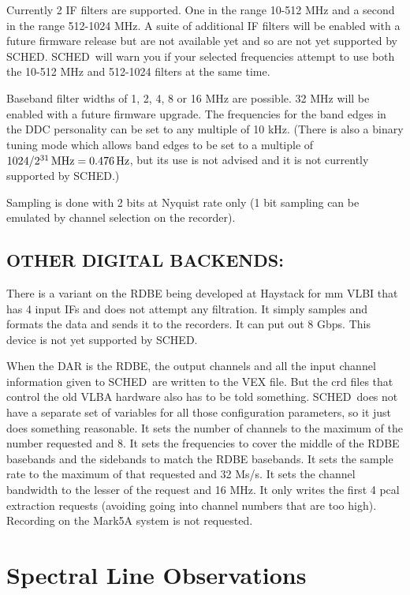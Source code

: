 \documentclass{report}
\newcommand{\sched}{{\sc SCHED}}
\newcommand{\schedb}{{\sc SCHED~}}
\begin{document}
Currently 2 IF filters are supported. One in the range 10-512 MHz and a
second in the range 512-1024 MHz. A suite of additional IF filters will
be enabled with a future firmware release but are not available yet and
so are not yet supported by \sched. \schedb will warn you if your
selected frequencies attempt to use both the 10-512 MHz and 512-1024
filters at the same time.

Baseband filter widths of 1, 2, 4, 8 or 16 MHz are possible. 32 MHz will
be enabled with a future firmware upgrade. The frequencies for the band
edges in the DDC personality can be set to any multiple of 10 kHz.
(There is also a binary tuning mode which allows band edges to be set to
a multiple of $1024/2^{31} \,{\rm MHz} = 0.476 \,{\rm Hz}$, but its use
is not advised and it is not currently supported by \sched.)

Sampling is done with 2 bits at Nyquist rate only (1 bit sampling can be
emulated by channel selection on the recorder).



\subsection{\label{SSEC:OTHERREC}OTHER DIGITAL BACKENDS:}

There is a variant on the RDBE being developed at Haystack for mm VLBI
that has 4 input IFs and does not attempt any filtration.  It simply
samples and formats the data and sends it to the recorders.  It can
put out 8 Gbps.  This device is not yet supported by SCHED.

When the DAR is the RDBE, the output channels and all the input
channel information given to \schedb are written to the VEX file.  But
the crd files that control the old VLBA hardware also has to be told
something. \schedb does not have a separate set of variables for all
those configuration parameters, so it just does something reasonable.
It sets the number of channels to the maximum of the number requested
and 8.  It sets the frequencies to cover the middle of the RDBE
basebands and the sidebands to match the RDBE basebands.  It sets the
sample rate to the maximum of that requested and 32 Ms/s.  It sets the
channel bandwidth to the lesser of the request and 16 MHz.  It only
writes the first 4 pcal extraction requests (avoiding going into
channel numbers that are too high).  Recording on the Mark5A system
is not requested.


\section{\label{SEC:LINE}Spectral Line Observations}
\end{document}

